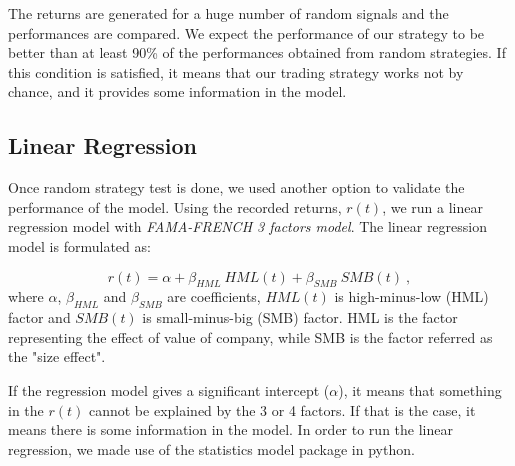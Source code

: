 The returns are generated for a huge number of random signals and the performances are compared. We expect the performance of our strategy to be better than at least 90\% of the performances obtained from random strategies. If this condition is satisfied, it means that our trading strategy works not by chance, and it provides some information in the model.


\subsection{Linear Regression}\label{ssec:linear}
Once random strategy test is done, we used another option to validate the performance of the model. Using the recorded returns, $r(t)$, we run a linear regression model with \textit{FAMA-FRENCH 3 factors model}. The linear regression model is formulated as:

\begin{equation}
r(t) = \alpha + \beta_{HML} \ HML(t) + \beta_{SMB} \ SMB(t) \ ,
\end{equation}
where $\alpha$, $\beta_{HML}$ and $\beta_{SMB}$ are coefficients, $HML(t)$ is high-minus-low (HML) factor and $SMB(t)$ is small-minus-big (SMB) factor. HML is the factor representing the effect of value of company, while SMB is the factor referred as the "size effect". \par

If the regression model gives a significant intercept ($\alpha$), it means that something in the $r(t)$ cannot be explained by the 3 or 4 factors. If that is the case, it means there is some information in the model. In order to run the linear regression, we made use of the statistics model package in python.
